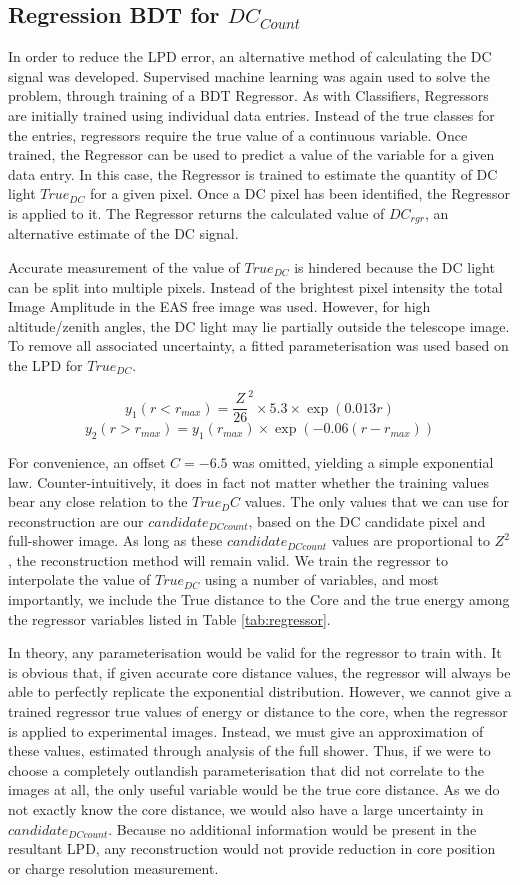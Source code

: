 \documentclass{article}
\begin{document}
\subsection{Regression BDT for $DC_{Count}$}
In order to reduce the LPD error, an alternative method of calculating the DC signal was developed. Supervised machine learning was again used to solve the problem, through training of a BDT Regressor. As with Classifiers, Regressors are initially trained using individual data entries. Instead of the true classes for the entries, regressors require the true value of a continuous variable. Once trained, the Regressor can be used to predict a value of the variable for a given data entry. In this case, the Regressor is trained to estimate the quantity of DC light $True_{DC}$ for a given pixel. Once a DC pixel has been identified, the Regressor is applied to it. The Regressor returns the calculated value of $DC_{rgr}$, an alternative estimate of the DC signal. 

Accurate measurement of the value of $True_{DC}$ is hindered because the DC light can be split into multiple pixels. Instead of the brightest pixel intensity the total Image Amplitude in the EAS free image was used. However, for high altitude/zenith angles, the DC light may lie partially outside the telescope image. To remove all associated uncertainty, a fitted parameterisation was used based on the LPD for $True_{DC}$.

\[ y_{1}(r<r_{max}) = \frac{Z}{26}^{2} \times 5.3 \times \exp(0.013 r)\]
\[ y_{2}(r > r_{max}) = y_{1}(r_{max}) \times \exp (-0.06( r-r_{max})) \]

For convenience, an offset $C=-6.5$ was omitted, yielding a simple exponential law. Counter-intuitively, it does in fact not matter whether the training values bear any close relation to the $True_DC$ values. The only values that we can use for reconstruction are our $candidate_{DC count}$, based on the DC candidate pixel and full-shower image. As long as these $candidate_{DC count}$ values are proportional to $Z^{2}$, the reconstruction method will remain valid. We train the regressor to interpolate the value of $True_{DC}$ using a number of variables, and most importantly, we include the True distance to the Core and the true energy among the regressor variables listed in Table \ref{tab:regressor}. 

In theory, any parameterisation would be valid for the regressor to train with. It is obvious that, if given accurate core distance values, the regressor will always be able to perfectly replicate the exponential distribution. However, we cannot give a trained regressor true values of energy or distance to the core, when the regressor is applied to experimental images. Instead, we must give an approximation of these values, estimated through analysis of the full shower. Thus, if we were to choose a completely outlandish parameterisation that did not correlate to the images at all, the only useful variable would be the true core distance. As we do not exactly know the core distance, we would also have a large uncertainty in $candidate_{DC count}$. Because no additional information would be present in the resultant LPD, any reconstruction would not provide reduction in core position or charge resolution measurement. 
\end{document}
